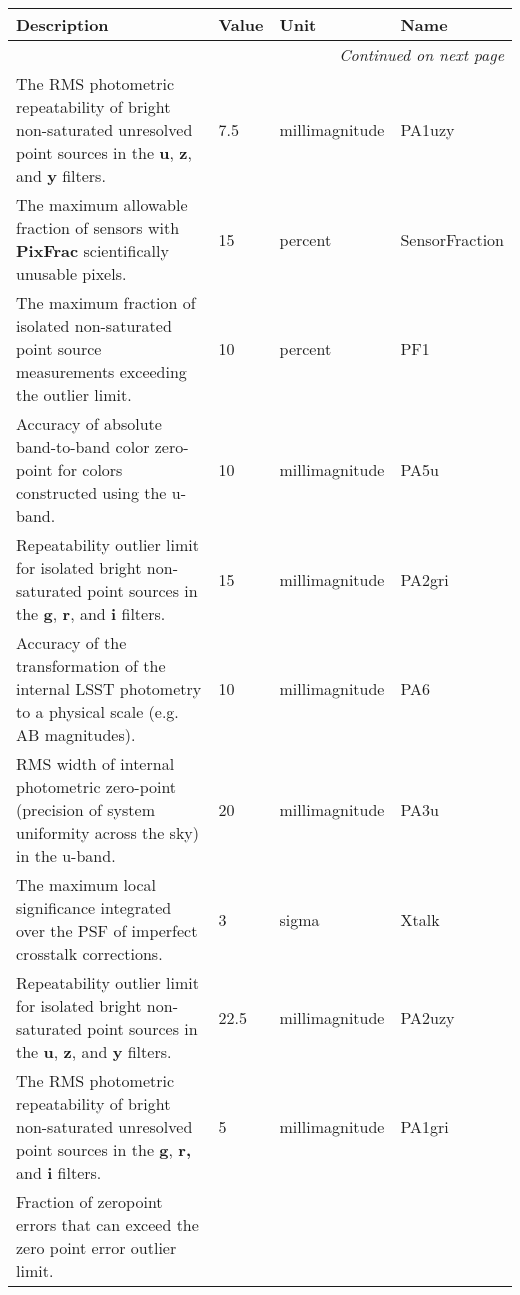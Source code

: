 \documentclass[SE,toc,lsstdraft]{lsstdoc}
\makeatletter
\newcommand{\paramname}[1]{\hspace{0pt}#1}
\newcommand{\unitname}[1]{\hspace{0pt}#1}
\newenvironment{parameters}[0]{%
\setlength\LTleft{0pt}
\setlength\LTright{\fill}
\begin{small}
\begin{longtable}[]{|p{0.49\textwidth}|l|p{0.6in}|p{1.70in}@{}|}

\hline \textbf{Description} & \textbf{Value} & \textbf{Unit} & \textbf{Name} \\ \hline
\endhead

\hline \multicolumn{4}{r}{\emph{Continued on next page}} \\
\endfoot

\hline\hline
\endlastfoot
}{%
\hline
\end{longtable}
\end{small}
}
\makeatother
\begin{document}
\begin{parameters}
The RMS photometric repeatability of bright non-saturated unresolved point sources in the \textbf{u}, \textbf{z}, and \textbf{y} filters.

&
7.5
&
\unitname{%
millimagnitude
}
&
\paramname{%
PA1uzy
} \\\hline
The maximum allowable fraction of sensors with \textbf{PixFrac} scientifically unusable pixels.

&
15
&
\unitname{%
percent
}
&
\paramname{%
SensorFraction
} \\\hline
The maximum fraction of isolated non-saturated point source measurements exceeding the outlier limit.
&
10
&
\unitname{%
percent
}
&
\paramname{%
PF1
} \\\hline
Accuracy of absolute band-to-band color zero-point for colors constructed using the u-band.

&
10
&
\unitname{%
millimagnitude
}
&
\paramname{%
PA5u
} \\\hline
Repeatability outlier limit for isolated bright non-saturated point sources in the \textbf{g}, \textbf{r}, and \textbf{i} filters.

&
15
&
\unitname{%
millimagnitude
}
&
\paramname{%
PA2gri
} \\\hline
Accuracy of the transformation of the internal LSST photometry to a physical scale (e.g. AB magnitudes).

&
10
&
\unitname{%
millimagnitude
}
&
\paramname{%
PA6
} \\\hline
RMS width of internal photometric zero-point (precision of system uniformity across the sky) in the u-band.
&
20
&
\unitname{%
millimagnitude
}
&
\paramname{%
PA3u
} \\\hline
The maximum local significance integrated over the PSF of imperfect crosstalk corrections.

&
3
&
\unitname{%
sigma
}
&
\paramname{%
Xtalk
} \\\hline
Repeatability outlier limit for isolated bright non-saturated point sources in the \textbf{u}, \textbf{z}, and \textbf{y} filters.

&
22.5
&
\unitname{%
millimagnitude
}
&
\paramname{%
PA2uzy
} \\\hline
The RMS photometric repeatability of bright non-saturated unresolved point sources in the \textbf{g}, \textbf{r,} and \textbf{i} filters.

&
5
&
\unitname{%
millimagnitude
}
&
\paramname{%
PA1gri
} \\\hline
Fraction of zeropoint errors that can exceed the zero point error outlier limit.


\end{parameters}
\end{document}
